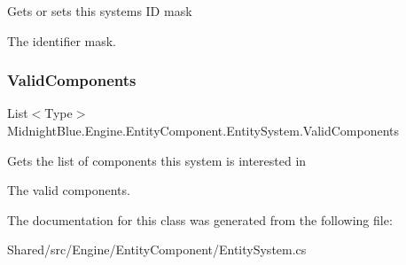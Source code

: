 Gets or sets this systems ID mask 

The identifier mask.\hypertarget{class_midnight_blue_1_1_engine_1_1_entity_component_1_1_entity_system_a2314e0dd40f6a59017ea1446c2d1dae4}{}\label{class_midnight_blue_1_1_engine_1_1_entity_component_1_1_entity_system_a2314e0dd40f6a59017ea1446c2d1dae4} 
\subsubsection{\texorpdfstring{Valid\+Components}{ValidComponents}}
{\footnotesize\ttfamily List$<$Type$>$ Midnight\+Blue.\+Engine.\+Entity\+Component.\+Entity\+System.\+Valid\+Components\hspace{0.3cm}{\ttfamily [get]}}



Gets the list of components this system is interested in 

The valid components.

The documentation for this class was generated from the following file\+:\begin{DoxyCompactItemize}
\item 
Shared/src/\+Engine/\+Entity\+Component/Entity\+System.\+cs\end{DoxyCompactItemize}
